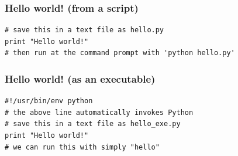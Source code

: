 \documentclass{beamer}
\begin{document}
\begin{frame}[fragile]
\frametitle{Hello world! (from a script)}
\begin{lstlisting}
# save this in a text file as hello.py
print "Hello world!"
# then run at the command prompt with 'python hello.py'
\end{lstlisting}
\end{frame}

\begin{frame}[fragile]
\frametitle{Hello world! (as an executable)}
\begin{lstlisting}
#!/usr/bin/env python
# the above line automatically invokes Python
# save this in a text file as hello_exe.py
print "Hello world!"
# we can run this with simply "hello"
\end{lstlisting}
\end{frame}
\end{document}
